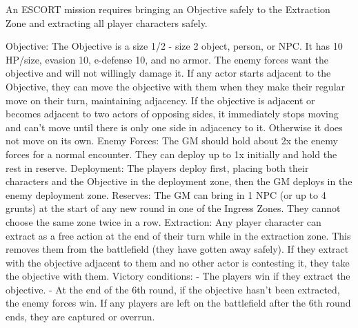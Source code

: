                                                                An ESCORT mission requires bringing an  
                                                               Objective safely to the Extraction Zone and  
                                                               extracting all player characters safely.  

                                                               Objective: The Objective is a size 1/2 - size 2  
                                                               object, person, or NPC. It has 10 HP/size,  
                                                               evasion 10, e-defense 10, and no armor. The  
                                                               enemy forces want the objective and will not  
                                                               willingly damage it. If any actor starts adjacent  
                                                               to the Objective, they can move the objective  
                                                               with them when they make their regular move  
                                                               on their turn, maintaining adjacency. If the  
                                                               objective is adjacent or becomes adjacent to  
                                                               two actors of opposing sides, it immediately  
                                                               stops moving and can’t move until there is only  
                                                               one side in adjacency to it. Otherwise it does  
                                                               not move on its own.  
                                                               Enemy Forces: The GM should hold about 2x  
                                                               the enemy forces for a normal encounter. They  
                                                               can deploy up to 1x initially and hold the rest in  
                                                               reserve.  
                                                               Deployment: The players deploy first, placing  
                                                               both their characters and the Objective in the  
                                                               deployment zone, then the GM deploys in the  
enemy deployment zone.  
Reserves: The GM can bring in 1 NPC (or up to 4 grunts) at the start of any new round in one of  
the Ingress Zones. They cannot choose the same zone twice in a row.  
Extraction: Any player character can extract as a free action at the end of their turn while in the  
extraction zone. This removes them from the battlefield (they have gotten away safely). If they  
extract with the objective adjacent to them and no other actor is contesting it, they take the  
objective with them.  
Victory conditions:   
          - The players win if they extract the objective.  
          - At the end of the 6th round, if the objective hasn’t been extracted, the enemy forces win.   
          If any players are left on the battlefield after the 6th round ends, they are captured or  
         overrun.  

